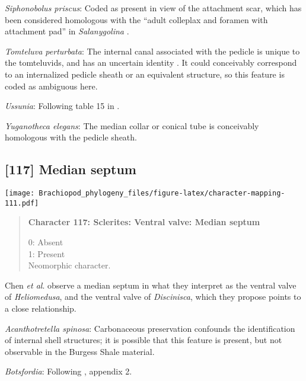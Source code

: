 \documentclass[openany]{book}
\theoremstyle{definition}
\theoremstyle{definition}
\theoremstyle{definition}
\theoremstyle{remark}
\begin{document}
\hypertarget{Siphonobolus_priscus-coding-116}{}
\emph{Siphonobolus priscus}: Coded as present in view of the attachment
scar, which has been considered homologous with the ``adult colleplax
and foramen with attachment pad'' in \emph{Salanygolina}
\citep{Popov2009Earlyontogeny}.

\hypertarget{Tomteluva_perturbata-coding-116}{}
\emph{Tomteluva perturbata}: The internal canal associated with the
pedicle is unique to the tomteluvids, and has an uncertain identity
\citep{Streng2016Anew}. It could conceivably correspond to an
internalized pedicle sheath or an equivalent structure, so this feature
is coded as ambiguous here.

\hypertarget{Ussunia-coding-116}{}
\emph{Ussunia}: Following table 15 in
\citet{Williams2000LinguliformeaCraniiformea}.

\hypertarget{Yuganotheca_elegans-coding-116}{}
\emph{Yuganotheca elegans}: The median collar or conical tube is
conceivably homologous with the pedicle sheath.

\subsection*{{[}117{]} Median septum}\label{median-septum}

\texttt{[image: Brachiopod\_phylogeny\_files/figure-latex/character-mapping-111.pdf]}

\begin{quote}
\textbf{Character 117: Sclerites: Ventral valve: Median septum}

0: Absent\\
1: Present\\
Neomorphic character.
\end{quote}

Chen \emph{et al}. \citeyearpar{Chen2007Reinterpretationof} observe a
median septum in what they interpret as the ventral valve of
\emph{Heliomedusa}, and the ventral valve of \emph{Discinisca}, which
they propose points to a close relationship.

\hypertarget{Acanthotretella_spinosa-coding-117}{}
\emph{Acanthotretella spinosa}: Carbonaceous preservation confounds the
identification of internal shell structures; it is possible that this
feature is present, but not observable in the Burgess Shale material.

\hypertarget{Botsfordia-coding-117}{}
\emph{Botsfordia}: Following \citet{Williams1998Thediversity}, appendix
2.
\end{document}
